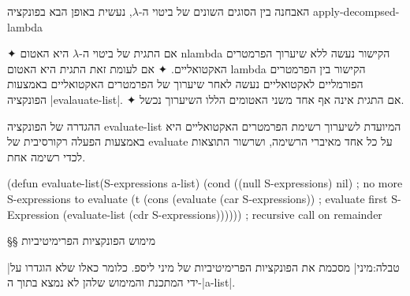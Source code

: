 האבחנה בין הסוגים השונים של ביטוי ה-$λ$, נעשית באופן הבא בפונקציה
apply-decompsed-lambda
\begin{itemize}
  ✦
  אם התגית של ביטוי ה-$λ$ היא האטום nlambda הקישור נעשה
  ללא שיערוך הפרמטרים
  האקטואליים.
  ✦ אם לעומת זאת התגית היא האטום lambda הקישור בין הפרמטרים הפורמליים
  לאקטואליים נעשה לאחר שיערוך של הפרמטרים האקטואליים באמצעות הפונקציה
  \E|evalauate-list|. ✦
  אם התגית אינה אף אחד משני האטומים הללו השיערוך נכשל.
\end{itemize}

ההגדרה של הפונקציה evaluate-list המיועדת לשיערוך רשימת הפרמטרים האקטואליים היא
באמצעות הפעלה רקורסיבית של evaluate על כל אחד מאיברי הרשימה, ושרשור התוצאות
לכדי רשימה אחת.
\begin{KERNEL}
(defun evaluate-list(S-expressions a-list)
  (cond ((null S-expressions) nil) ; no more S-expressions to evaluate
    (t (cons
          (evaluate (car S-expressions)) ; evaluate first S-Expression
          (evaluate-list (cdr S-expressions)))))) ; recursive call on remainder
\end{KERNEL}

\vfill
\pagebreak[4]
§§ מימוש הפונקציות הפרימיטיביות

|טבלה:מיני| מסכמת את הפונקציות הפרימיטיביות של מיני ליספ. כלומר כאלו שלא
הוגדרו על ידי המתכנת והמימוש שלהן לא נמצא בתוך ה-\E|a-list|.

